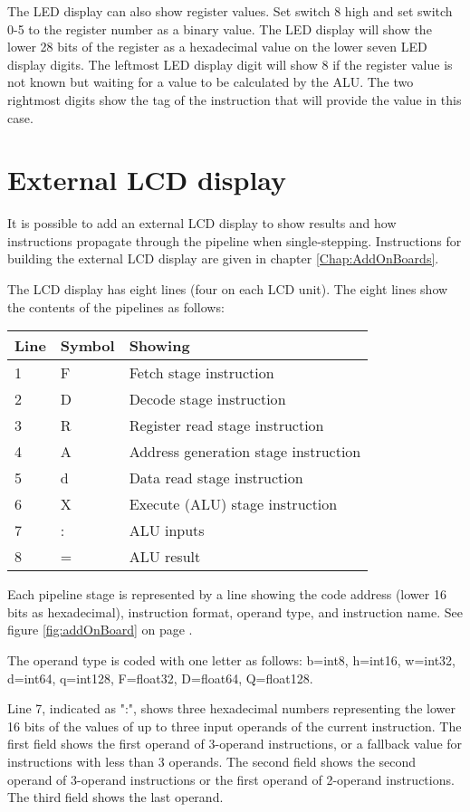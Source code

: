 \documentclass[11pt,a4paper,oneside,openright]{report}
\newcommand{\vv}{ \vspace{2mm} }   %
\begin{document}
The LED display can also show register values. Set switch 8 high and set switch 0-5 to the register number as a binary value. The LED display will show the lower 28 bits of the register as a hexadecimal value on the lower seven LED display digits. The leftmost LED display digit will show 8 if the register value is not known but waiting for a value to be calculated by the ALU. The two rightmost digits show the tag of the instruction that will provide the value in this case.
\vv

\section{External LCD display}
It is possible to add an external LCD display to show results and how instructions propagate through the pipeline when single-stepping. Instructions for building the external LCD display are given in chapter \ref{Chap:AddOnBoards}.
\vv

The LCD display has eight lines (four on each LCD unit). The eight lines show the contents of the pipelines as follows:
\vv

\begin{tabular}{|l|l|l|} 
\hline
\bfseries Line & \bfseries Symbol & \bfseries Showing  \\ \hline
1  & F & Fetch stage instruction \\ \hline
2  & D & Decode stage instruction \\ \hline
3  & R & Register read stage instruction \\ \hline
4  & A & Address generation stage instruction \\ \hline
5  & d & Data read stage instruction \\ \hline
6  & X & Execute (ALU) stage instruction \\ \hline
7  & : & ALU inputs \\ \hline
8  & = & ALU result \\ \hline
\end{tabular}
\vv

Each pipeline stage is represented by a line showing the code address (lower 16 bits as hexadecimal), instruction format, operand type, and instruction name. See figure \ref{fig:addOnBoard} on page \pageref{fig:addOnBoard}. 
\vv

The operand type is coded with one letter as follows: b=int8, h=int16, w=int32, d=int64, q=int128, F=float32, D=float64, Q=float128.
\vv

Line 7, indicated as ":", shows three hexadecimal numbers representing the lower 16 bits of the values of up to three input operands of the current instruction. The first field shows the first operand of 3-operand instructions, or a fallback value for instructions with less than 3 operands. The second field shows the second operand of 3-operand instructions or the first operand of 2-operand instructions. The third field shows the last operand.
\vv
\end{document}
